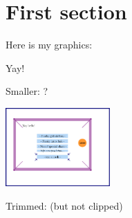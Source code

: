 \documentclass[12pt]{article}
\begin{document}
\section{First section}

Here is my graphics:

\fboxsep=0pt\relax
{}

Yay!

\clearpage

Smaller: ?

\includegraphics[width=4cm]{testgraphics2}

\vspace{4cm}
Trimmed: (but not clipped)

\fboxsep=0pt\relax
{}
\end{document}
